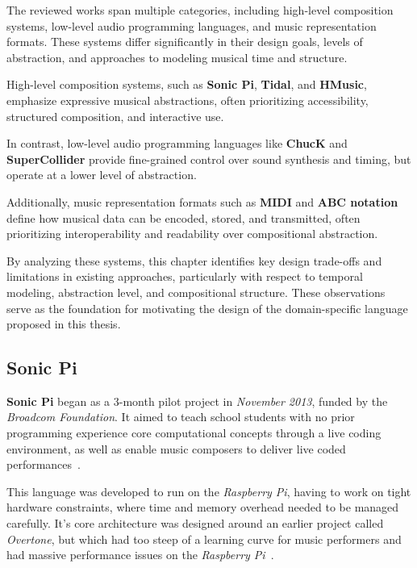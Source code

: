 The reviewed works span multiple categories, including high-level composition systems, low-level audio programming
languages, and music representation formats.
These systems differ significantly in their design goals, levels of abstraction, and approaches to modeling musical
time and structure.

High-level composition systems, such as \textbf{Sonic Pi}, \textbf{Tidal}, and \textbf{HMusic}, emphasize expressive
musical abstractions, often prioritizing accessibility, structured composition, and interactive use.

In contrast, low-level audio programming languages like \textbf{ChucK} and \textbf{SuperCollider} provide fine-grained
control over sound synthesis and timing, but operate at a lower level of abstraction.

Additionally, music representation formats such as \textbf{MIDI} and \textbf{ABC notation} define how musical data can
be encoded, stored, and transmitted, often prioritizing interoperability and readability over compositional abstraction.

By analyzing these systems, this chapter identifies key design trade-offs and limitations in existing approaches,
particularly with respect to temporal modeling, abstraction level, and compositional structure.
These observations serve as the foundation for motivating the design of the domain-specific language proposed in
this thesis.


\subsection{Sonic Pi}\label{detail-subsec:sonic-pi}

\textbf{Sonic Pi} began as a 3-month pilot project in \textit{November 2013}, funded by the \textit{Broadcom
Foundation}.
It aimed to teach school students with no prior programming experience core computational concepts through a live coding
environment, as well as enable music composers to deliver live coded performances~\cite{Aaron_Blackwell_2013,
Aaron_2016}.

This language was developed to run on the \textit{Raspberry Pi}, having to work on tight hardware constraints, where
time and memory overhead needed to be managed carefully.
It's core architecture was designed around an earlier project called \textit{Overtone}, but which had too steep of a
learning curve for music performers and had massive performance issues on the \textit{Raspberry Pi}~\cite{Aaron_2016}.

